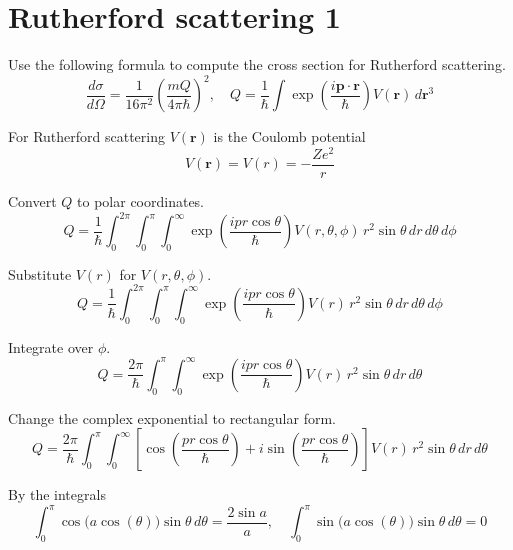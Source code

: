 


\section*{Rutherford scattering 1}

Use the following formula to compute the cross section for Rutherford scattering.
\begin{equation*}
\frac{d\sigma}{d\Omega}=\frac{1}{16\pi^2}\left(\frac{mQ}{4\pi\hbar}\right)^2,\quad
Q=\frac{1}{\hbar}\int\exp\left(\frac{i\mathbf p\cdot\mathbf r}{\hbar}\right)V(\mathbf r)\,d\mathbf r^3
\end{equation*}

For Rutherford scattering $V(\mathbf r)$ is the Coulomb potential
\begin{equation*}
V(\mathbf r)=V(r)=-\frac{Ze^2}{r}
\end{equation*}

Convert $Q$ to polar coordinates.
\begin{equation*}
Q=\frac{1}{\hbar}
\int_0^{2\pi}
\int_0^\pi
\int_0^\infty
\exp\left(\frac{ipr\cos\theta}{\hbar}\right)V(r,\theta,\phi)
\,r^2\sin\theta\,dr\,d\theta\,d\phi
\end{equation*}

Substitute $V(r)$ for $V(r,\theta,\phi)$.
\begin{equation*}
Q=\frac{1}{\hbar}
\int_0^{2\pi}
\int_0^\pi
\int_0^\infty
\exp\left(\frac{ipr\cos\theta}{\hbar}\right)V(r)
\,r^2\sin\theta\,dr\,d\theta\,d\phi
\end{equation*}

Integrate over $\phi$.
\begin{equation*}
Q=\frac{2\pi}{\hbar}
\int_0^\pi
\int_0^\infty
\exp\left(\frac{ipr\cos\theta}{\hbar}\right)V(r)
\,r^2\sin\theta\,dr\,d\theta
\end{equation*}

Change the complex exponential to rectangular form.
\begin{equation*}
Q=\frac{2\pi}{\hbar}
\int_0^\pi
\int_0^\infty
\left[
\cos\left(\frac{pr\cos\theta}{\hbar}\right)
+i\sin\left(\frac{pr\cos\theta}{\hbar}\right)
\right]
V(r)\,r^2\sin\theta\,dr\,d\theta
\end{equation*}

By the integrals
\begin{equation*}
\int_0^\pi\cos\bigl(a\cos(\theta)\bigr)\sin\theta\,d\theta=\frac{2\sin a}{a},\quad
\int_0^\pi\sin\bigl(a\cos(\theta)\bigr)\sin\theta\,d\theta=0
\end{equation*}

